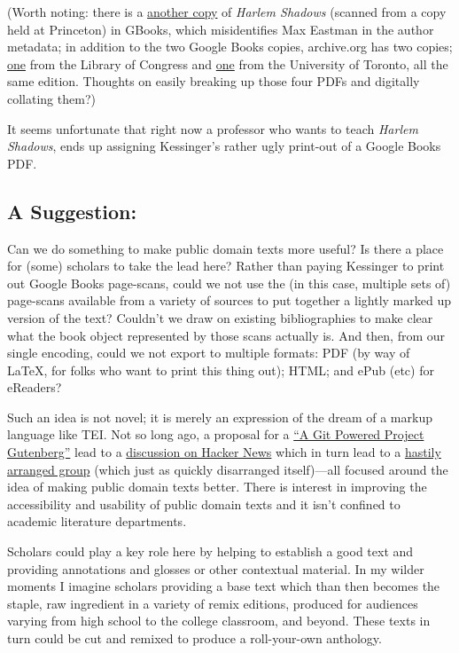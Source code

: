 \documentclass[
  12pt,
]{article}
\begin{document}
(Worth noting: there is a
\href{http://books.google.com/books?id=EVFBAAAAYAAJ}{another copy} of
\emph{Harlem Shadows} (scanned from a copy held at Princeton) in GBooks,
which misidentifies Max Eastman in the author metadata; in addition to
the two Google Books copies, archive.org has two copies;
\href{http://www.archive.org/details/harlemshadows00mcka}{one} from the
Library of Congress and
\href{http://www.archive.org/details/harlemshadowspoe00mckauoft}{one}
from the University of Toronto, all the same edition. Thoughts on easily
breaking up those four PDFs and digitally collating them?)

It seems unfortunate that right now a professor who wants to teach
\emph{Harlem Shadows}, ends up assigning Kessinger's rather ugly
print-out of a Google Books PDF.

\hypertarget{a-suggestion}{%
\subsection{A Suggestion:}\label{a-suggestion}}

Can we do something to make public domain texts more useful? Is there a
place for (some) scholars to take the lead here? Rather than paying
Kessinger to print out Google Books page-scans, could we not use the (in
this case, multiple sets of) page-scans available from a variety of
sources to put together a lightly marked up version of the text?
Couldn't we draw on existing bibliographies to make clear what the book
object represented by those scans actually is. And then, from our single
encoding, could we not export to multiple formats: PDF (by way of LaTeX,
for folks who want to print this thing out); HTML; and ePub (etc) for
eReaders?

Such an idea is not novel; it is merely an expression of the dream of a
markup language like TEI. Not so long ago, a proposal for a
\href{http://neosmart.net/blog/2012/the-case-for-a-git-powered-project-gutenberg/}{``A
Git Powered Project Gutenberg''} lead to a
\href{http://news.ycombinator.com/item?id=3638917}{discussion on Hacker
News} which in turn lead to a
\href{http://groups.google.com/group/prj-alexandria}{hastily arranged
group} (which just as quickly disarranged itself)---all focused around
the idea of making public domain texts better. There is interest in
improving the accessibility and usability of public domain texts and it
isn't confined to academic literature departments.

Scholars could play a key role here by helping to establish a good text
and providing annotations and glosses or other contextual material. In
my wilder moments I imagine scholars providing a base text which than
then becomes the staple, raw ingredient in a variety of remix editions,
produced for audiences varying from high school to the college
classroom, and beyond. These texts in turn could be cut and remixed to
produce a roll-your-own anthology.
\end{document}
